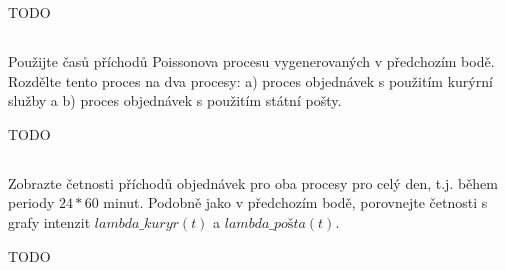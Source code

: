 \documentclass[a4paper]{article}
\begin{document}
\vspace{1cm}
TODO

\subsection{}
Použijte časů příchodů Poissonova procesu vygenerovaných v předchozím bodě. Rozdělte tento proces na dva procesy:\newline
a) proces objednávek s použitím kurýrní služby a\newline
b) proces objednávek s použitím státní pošty.

\vspace{1cm}
TODO

\subsection{}
Zobrazte četnosti příchodů objednávek pro oba procesy pro celý den, t.j. během periody $24*60$ minut. Podobně jako v předchozím bodě, porovnejte četnosti s grafy intenzit $lambda\_kuryr(t)$ a $lambda\_pošta(t)$.

\vspace{1cm}
TODO
\end{document}
